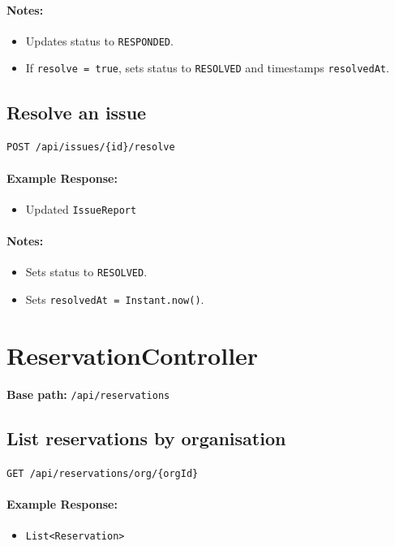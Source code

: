 \documentclass[a4paper,11pt]{article}
\begin{document}
\paragraph{Notes:}
\begin{itemize}
    \item Updates status to \texttt{RESPONDED}.
    \item If \texttt{resolve = true}, sets status to \texttt{RESOLVED} and timestamps \texttt{resolvedAt}.
\end{itemize}

\subsection{Resolve an issue}
\texttt{POST /api/issues/\{id\}/resolve}

\paragraph{Example Response:}
\begin{itemize}
    \item Updated \texttt{IssueReport}
\end{itemize}

\paragraph{Notes:}
\begin{itemize}
    \item Sets status to \texttt{RESOLVED}.
    \item Sets \texttt{resolvedAt = Instant.now()}.
\end{itemize}

\hrulefill

\section{ReservationController}
\textbf{Base path:} \texttt{/api/reservations}

\subsection{List reservations by organisation}
\texttt{GET /api/reservations/org/\{orgId\}}

\paragraph{Example Response:}
\begin{itemize}
    \item \texttt{List<Reservation>}
\end{itemize}
\end{document}
